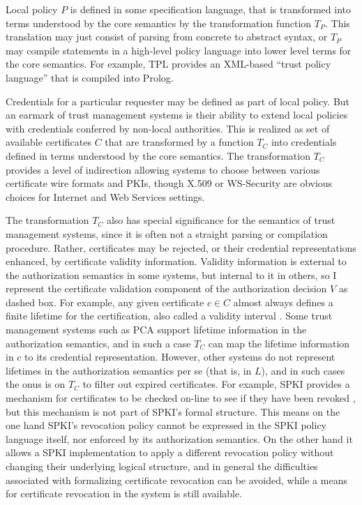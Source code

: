 \tmstructfig

Local policy $P$ is defined in some specification language, that is transformed into terms
understood by the core semantics by the transformation function $T_P$. This translation may just
consist of parsing from concrete to abstract syntax, or $T_P$ may compile statements in a
high-level policy language into lower level terms for the core semantics. For example, TPL
\cite{Herzberg:ACMPKI} provides an XML-based ``trust policy language'' that is compiled into
Prolog.

Credentials for a particular requester may be defined as part of local policy. But an earmark of
trust management systems is their ability to extend local policies with credentials conferred by
non-local authorities. This is realized as set of available certificates $C$ that are
transformed by a function $T_C$ into credentials defined in terms understood by the core
semantics. The transformation $T_C$ provides a level of indirection allowing systems to choose
between various certificate wire formats and PKIs, though X.509 \cite{X509} or WS-Security
\cite{OASIS:WSSTC} are obvious choices for Internet and Web Services settings.

The transformation $T_C$ also has special significance for the semantics of trust management
systems, since it is often not a straight parsing or compilation procedure. Rather, certificates
may be rejected, or their credential representations enhanced, by certificate validity
information. Validity information is external to the authorization semantics in some systems,
but internal to it in others, so I represent the certificate validation component of the
authorization decision $V$ as dashed box. For example, any given certificate $c \in C$ almost
always defines a finite lifetime for the certification, also called a validity interval
\cite{winslett-adl97}. Some trust management systems such as PCA \cite{Bauer:GFACSW} support
lifetime information in the authorization semantics, and in such a case $T_C$ can map the
lifetime information in $c$ to its credential representation. However, other systems do not
represent lifetimes in the authorization semantics per se (that is, in $L$), and in such cases
the onus is on $T_C$ to filter out expired certificates. For example, SPKI provides a mechanism
for certificates to be checked on-line to see if they have been revoked \cite{RFC-2693}, but
this mechanism is not part of SPKI's formal structure. This means on the one hand SPKI's
revocation policy cannot be expressed in the SPKI policy language itself, nor enforced by its
authorization semantics. On the other hand it allows a SPKI implementation to apply a different
revocation policy without changing their underlying logical structure, and in general the
difficulties associated with formalizing certificate revocation
\cite{Stubblebine:RSAERDS,Stubblebine:ALSSRR,Rivest:CWECRL} can be avoided, while a means for
certificate revocation in the system is still available.

